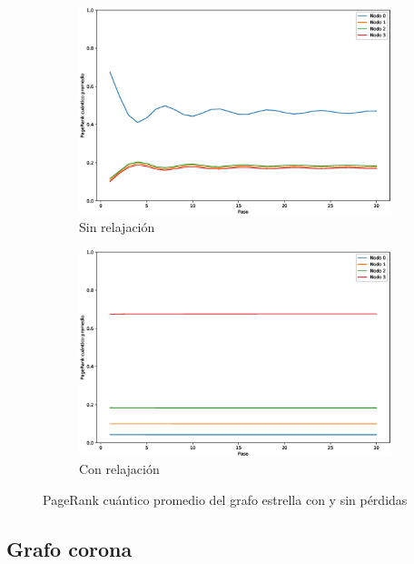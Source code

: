 \begin{figure}[H]
    \centering
    \begin{subfigure}[m]{0.45\textwidth}
        \centering
        \includegraphics[width=0.9\linewidth]{img/star-mean-lossless.eps}
        \caption{Sin relajación}
    \end{subfigure}
    \begin{subfigure}[m]{0.45\textwidth}
        \centering
        \includegraphics[width=0.9\linewidth]{img/star-mean-lossy.eps}
        \caption{Con relajación}
    \end{subfigure}
    \caption[PageRank cuántico promedio del grafo estrella con y sin pérdidas]{PageRank cuántico promedio del grafo estrella con y sin pérdidas}
    \label{fig:meanstarlossy}
\end{figure}

\subsection{Grafo corona}

